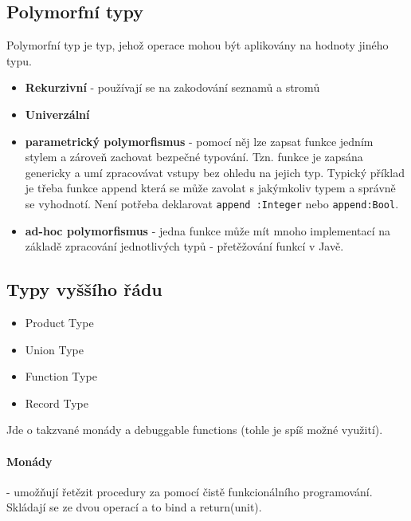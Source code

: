 \subsection{Polymorfní typy}
Polymorfní typ je typ, jehož operace mohou být aplikovány na hodnoty jiného typu.
\begin{itemize}
\item \textbf{Rekurzivní} - používají se na zakodování seznamů a stromů
\item \textbf{Univerzální}
\item \textbf{parametrický polymorfismus} - pomocí něj lze zapsat funkce jedním stylem a zároveň zachovat bezpečné typování. Tzn. funkce je zapsána genericky a umí zpracovávat vstupy bez ohledu na jejich typ. Typický příklad je třeba funkce append která se může zavolat s jakýmkoliv typem a správně se vyhodnotí. Není potřeba deklarovat \texttt{append :Integer} nebo \texttt{append:Bool}.
\item \textbf{ad-hoc polymorfismus} - jedna funkce může mít mnoho implementací na základě zpracování jednotlivých typů - přetěžování funkcí v Javě.
\end{itemize}



\subsection{Typy vyššího řádu}
\begin{itemize}
\item Product Type
\item Union Type
\item Function Type
\item Record Type
\end{itemize}

Jde o takzvané monády a debuggable functions (tohle je spíš možné využití). 

\paragraph{Monády} - umožňují řetězit procedury za pomocí čistě funkcionálního programování. Skládají se ze dvou operací a to bind a return(unit). 

\noindent \textit{}



